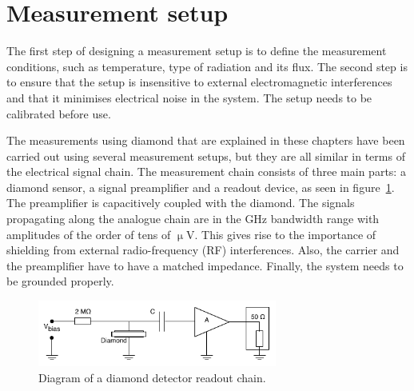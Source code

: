 \section{Measurement setup}
\label{sec:meassetup}
The first step of designing a measurement setup is to define the measurement conditions, such as temperature, type of radiation and its flux. The second step is to ensure that the setup is insensitive to external electromagnetic interferences and that it minimises electrical noise in the system. The setup needs to be calibrated before use. 


The measurements using diamond that are explained in these chapters have been carried out using several measurement setups, but they are all similar in terms of the electrical signal chain. The measurement chain consists of three main parts: a diamond sensor, a signal preamplifier and a readout device, as seen in figure~\ref{fig:ro-chain}. The preamplifier is capacitively coupled with the diamond. The signals propagating along the analogue chain are in the GHz bandwidth range with amplitudes of the order of tens of $\upmu$V. This gives rise to the importance of shielding from external radio-frequency (RF) interferences. Also, the carrier and the preamplifier have to have a matched impedance. Finally, the system needs to be grounded properly.

\begin{figure}
\centering
\includegraphics[width=0.7\textwidth]{03_measurement_results/plots/ro-chain}
\caption{Diagram of a diamond detector readout chain.}
\label{fig:ro-chain}
\end{figure}


